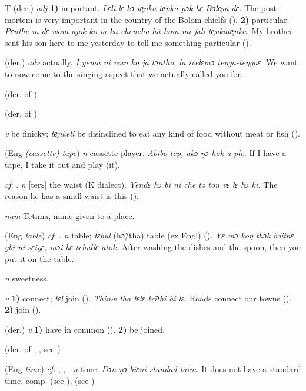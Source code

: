 \begin{letter}{T}
 (der.) \textit{adj} \textbf{1)} important. \textit{Lɛli lɛ kɔ te̹nka-te̹nka pɔk bɛ Bo̹lo̹m dɛ.} The post-mortem is very important in the country of the Bolom chielfs (\citealt{Pichl1967}). \textbf{2)} particular. \textit{Pɛnthe-m dɛ wom ajok ko-m ka chencha hã hom mi jali te̹nkate̹nka.} My brother sent his son here to me yesterday to tell me something particular (\citealt{Pichl1967}).

 (der.) \textit{adv} actually. \textit{I yema ni wun ko ja tɔntho, la ivelɛmɔ teŋga-teŋgaɛ.} We want to now come to the singing aspect that we actually called you for.

 (der. of ) 

 (der. of ) 

 \textit{v} be finicky; \textit{te̹nkeli} be disinclined to eat any kind of food without meat or fish (\citealt{Pichl1967}). 

 (Eng \textit{(cassette) tape}) \textit{n} cassette player. \textit{Abibo tep, akɔ ŋɔ hok a ple.} If I have a tape, I take it out and play (it).

 \textit{cf}: . \textit{n} [terɛ] the waist (K dialect). \textit{Yendɛ hɔ bi ni che tə ton vɛ lɛ hɔ ki.} The reason he has a small waist is this (\citealt{Sumner1921}). 

 \textit{nam} Tetima, name given to a place. 

 (Eng \textit{table}) \textit{cf}: . \textit{n} table; \textit{tɛbul} (hɔ̃/tha) table (ex Engl) (\citealt{Pichl1967}). \textit{Yɛ mɔ koŋ thɔk boithɛ gbi ni sɛiyɛ, mɔi bɛ tebullɛ atok.} After washing the dishes and the spoon, then you put it on the table.

 \textit{n} sweetness.

 \textit{v} \textbf{1)} connect; \textit{tɛl} join (\citealt{Sumner1921}). \textit{Thinæ tha tɛlɛ trïthi hĩ lɛ.} Roads connect our towns (\citealt{Pichl1967}). \textbf{2)} join (\citealt{Sumner1921}).

 (der.) \textit{v} \textbf{1)} have in common (\citealt{Pichl1967}). \textbf{2)} be joined.

 (der. of , , see ) 

 (Eng \textit{time}) \textit{cf}: , , . \textit{n} time. \textit{Ŋɔn ŋɔ biɛni standad taim.} It does not have a standard time. comp.  (see ),  (see ) 


\end{letter}
